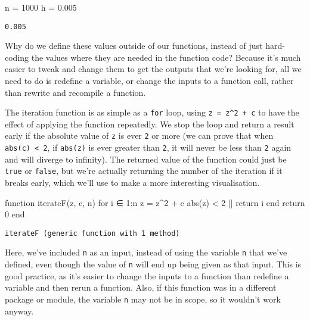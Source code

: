 \documentclass[
  letterpaper,
  DIV=11,
  numbers=noendperiod]{scrreprt}
\newenvironment{Shaded}{\begin{snugshade}}{\end{snugshade}}
\newcommand{\ControlFlowTok}[1]{\textcolor[rgb]{0.00,0.23,0.31}{#1}}
\newcommand{\FloatTok}[1]{\textcolor[rgb]{0.68,0.00,0.00}{#1}}
\newcommand{\FunctionTok}[1]{\textcolor[rgb]{0.28,0.35,0.67}{#1}}
\newcommand{\KeywordTok}[1]{\textcolor[rgb]{0.00,0.23,0.31}{#1}}
\newcommand{\NormalTok}[1]{\textcolor[rgb]{0.00,0.23,0.31}{#1}}
\newcommand{\OperatorTok}[1]{\textcolor[rgb]{0.37,0.37,0.37}{#1}}
\begin{document}
\begin{Shaded}
\begin{Highlighting}[]
\NormalTok{n }\OperatorTok{=} \FloatTok{1000}
\NormalTok{h }\OperatorTok{=} \FloatTok{0.005}
\end{Highlighting}
\end{Shaded}

\begin{verbatim}
0.005
\end{verbatim}

Why do we define these values outside of our functions, instead of just
hard-coding the values where they are needed in the function code?
Because it's much easier to tweak and change them to get the outputs
that we're looking for, all we need to do is redefine a variable, or
change the inputs to a function call, rather than rewrite and recompile
a function.

The iteration function is as simple as a \texttt{for} loop, using
\texttt{z\ =\ z\^{}2\ +\ c} to have the effect of applying the function
repeatedly. We stop the loop and return a result early if the absolute
value of \texttt{z} is ever \texttt{2} or more (we can prove that when
\texttt{abs(c)\ \textless{}\ 2}, if \texttt{abs(z)} is ever greater than
\texttt{2}, it will never be less than \texttt{2} again and will diverge
to infinity). The returned value of the function could just be
\texttt{true} or \texttt{false}, but we're actually returning the number
of the iteration if it breaks early, which we'll use to make a more
interesting visualisation.

\begin{Shaded}
\begin{Highlighting}[]
\KeywordTok{function} \FunctionTok{iterateF}\NormalTok{(z, c, n)}
    \ControlFlowTok{for}\NormalTok{ i }\OperatorTok{∈} \FloatTok{1}\OperatorTok{:}\NormalTok{n}
\NormalTok{        z }\OperatorTok{=}\NormalTok{ z}\OperatorTok{\^{}}\FloatTok{2} \OperatorTok{+}\NormalTok{ c}
        \FunctionTok{abs}\NormalTok{(z) }\OperatorTok{\textless{}} \FloatTok{2} \OperatorTok{||} \ControlFlowTok{return}\NormalTok{ i}
    \ControlFlowTok{end}
    \ControlFlowTok{return} \FloatTok{0}
\KeywordTok{end}
\end{Highlighting}
\end{Shaded}

\begin{verbatim}
iterateF (generic function with 1 method)
\end{verbatim}

Here, we've included \texttt{n} as an input, instead of using the
variable \texttt{n} that we've defined, even though the value of
\texttt{n} will end up being given as that input. This is good practice,
as it's easier to change the inputs to a function than redefine a
variable and then rerun a function. Also, if this function was in a
different package or module, the variable \texttt{n} may not be in
scope, so it wouldn't work anyway.
\end{document}
